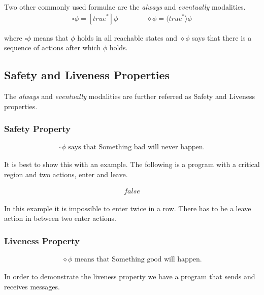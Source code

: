 \documentclass{clseminar}
\begin{document}
  Two other commonly used formulae are the \textit{always} and \textit{eventually} modalities.\\

  \begin{align*}
    \square\phi = [\mathit{true}^*]\phi \qquad\qquad    \diamond\phi = \langle\mathit{true}^*\rangle\phi
  \end{align*}

  where $\square\phi$ means that $\phi$ holds in all reachable states and $\diamond\phi$ says that there is a sequence of actions after which $\phi$ holds. \\

  \subsection{Safety and Liveness Properties}

  The \textit{always} and \textit{eventually} modalities are further referred as Safety and Liveness properties.

  \subsubsection{Safety Property}

  \begin{align*}
    \square\phi \text{ says that Something bad will never happen.}
  \end{align*}

  It is best to show this with an example. The following is a program with a critical region and two actions, enter and leave.

  \begin{align*}
    [\mathit{true}^*\cdot \mathit{enter} \cdot \overline{\mathit{leave}}^* \cdot \mathit{enter}]\mathit{false}
  \end{align*}

  In this example it is impossible to enter twice in a row. There has to be a leave action in
  between two enter actions.

  \pagebreak
  \subsubsection{Liveness Property}

  \begin{align*}
    \diamond\phi \text{ means that Something good will happen.}
  \end{align*}

  In order to demonstrate the liveness property we have a program that sends and receives messages.
\end{document}
